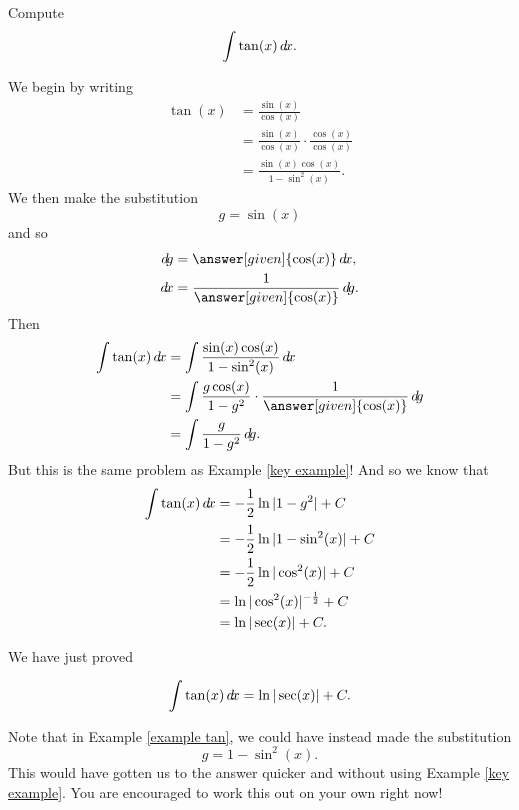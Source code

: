 \documentclass{ximera}
\begin{document}

\begin{example}\label{example tan}
Compute
\[
\int \tan(x) \mathop{}\!d\! x.
\]
\begin{explanation}
We begin by writing
\begin{align*}
\tan(x) &= \frac{\sin(x)}{\cos(x)}  \\
&= \frac{\sin(x)}{\cos(x)} \cdot \frac{\cos(x)}{\cos(x)}  \\
&= \frac{\sin(x) \cos(x)}{1 - \sin^2(x)}.
\end{align*}
We then make the substitution
\[
g = \sin(x)
\]
and so
\begin{align*}
\d g &= \answer[given]{\cos(x)} \d x,\\
\d x &= \frac{1}{\answer[given]{\cos(x)}} \d g.
\end{align*}
Then
\begin{align*}
\int \tan(x) \d x &= \int \frac{\sin(x) \cos(x)}{1 - \sin^2(x)} \d x  \\
&= \int \frac{g \cos(x)}{1 - g^2} \cdot \frac{1}{\answer[given]{\cos(x)}} \d g  \\
&= \int \frac{g}{1-g^2} \d g.
\end{align*}
But this is the same problem as Example \ref{key example}!  
And so we know that
\begin{align*}
\int \tan(x) \mathop{}\!d\! x &= - \frac{1}{2} \ln|1-g^2| + C  \\
&= - \frac{1}{2} \ln|1-\sin^2 (x)| + C  \\
&= - \frac{1}{2} \ln|\cos^2(x)| + C  \\
&= \ln|\cos^2(x)|^{- \frac{1}{2}} + C  \\
&= \ln|\sec(x)| + C.
\end{align*}
\end{explanation}
\end{example}

We have just proved

\begin{theorem}
\[
\int \tan(x) \mathop{}\!d\! x = \ln|\sec(x)| + C.
\]
\end{theorem}

Note that in Example \ref{example tan}, we could have instead made the substitution
\[
g = 1-\sin^2(x).
\]
This would have gotten us to the answer quicker and without using Example \ref{key example}.  
You are encouraged to work this out on your own right now!
\end{document}
